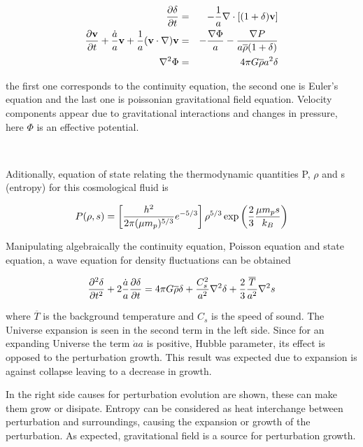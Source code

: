 \begin{eqnarray}
\frac{\partial \delta}{\partial t} &=& -\frac{1}{a}\nabla\cdot[(1+\delta)\textbf{v}]\nonumber\\
\frac{\partial \textbf{v}}{\partial t}+\frac{\dot{a}}{a}\textbf{v}+\frac{1}{a}(\textbf{v}\cdot\nabla)\textbf{v}& = &
-\frac{\nabla \Phi}{a}-\frac{\nabla P}{a\overline{\rho}(1+\delta)}\nonumber\\
\nabla^2 \Phi &=& 4\pi G\overline{\rho}a^2\delta
\label{ec.movimiento}
\end{eqnarray}

the first one corresponds to the continuity equation, the second one is Euler's 
equation and the last one is poissonian gravitational field equation. Velocity 
components appear due to gravitational interactions and changes in pressure,
here $\Phi$ is an effective potential. 

\

Aditionally, equation of state relating the thermodynamic quantities P, 
$\rho$ and s (entropy) for this cosmological fluid is 

\begin{equation}
P(\rho,s)= \left[\frac{h^2}{2\pi(\mu m_p)^{5/3}}e^{-5/3}\right]\rho^{5/3}\exp \left(\frac{2}{3}\frac{\mu m_ps}{k_B}\right)
\label{ec.estado}
\end{equation}

Manipulating algebraically the continuity equation, Poisson equation and state equation,
a wave equation for density fluctuations can be obtained

\begin{equation}
\frac{\partial^2\delta}{\partial t^2}+2\frac{\dot{a}}{a}\frac{\partial \delta}{\partial t} =
4\pi G \overline{\rho}\delta + \frac{C_s^2}{a^2}\nabla^2\delta+\frac{2}{3}\frac{\overline{T}}{a^2}\nabla^2s
\label{onda}
\end{equation}

where $\overline{T}$ is the background temperature and $C_s$ is the speed of sound.
The Universe expansion is seen in the second term in the left side. Since for an expanding
Universe the term $\dot{a}{a}$ is positive, Hubble parameter, its effect is opposed to the 
perturbation growth. This result was expected due to expansion is against collapse leaving to
a decrease in growth. 	

In the right side causes for perturbation evolution are shown, these can make them grow 
or disipate. Entropy can be considered as heat interchange between perturbation and 
surroundings, causing the expansion or growth of the perturbation. As expected, 
gravitational field is a source for perturbation growth. 

